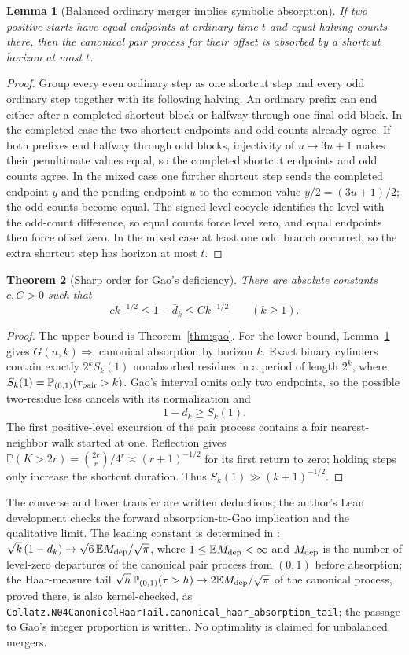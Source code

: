 \documentclass[11pt]{amsart}
\newtheorem{theorem}{Theorem}[section]
\newtheorem{lemma}[theorem]{Lemma}
\theoremstyle{definition}
\theoremstyle{remark}
\newcommand{\E}{\mathbb E}
\newcommand{\PP}{\mathbb P}
\begin{document}
\begin{lemma}[Balanced ordinary merger implies symbolic absorption]\label{lem:later-converse}
If two positive starts have equal endpoints at ordinary time $t$ and equal halving counts there, then the canonical pair process for their offset is absorbed by a shortcut horizon at most $t$.
\end{lemma}
\begin{proof}
Group every even ordinary step as one shortcut step and every odd ordinary step together with its following halving. An ordinary prefix can end either after a completed shortcut block or halfway through one final odd block. In the completed case the two shortcut endpoints and odd counts already agree. If both prefixes end halfway through odd blocks, injectivity of $u\mapsto3u+1$ makes their penultimate values equal, so the completed shortcut endpoints and odd counts agree. In the mixed case one further shortcut step sends the completed endpoint $y$ and the pending endpoint $u$ to the common value $y/2=(3u+1)/2$; the odd counts become equal. The signed-level cocycle identifies the level with the odd-count difference, so equal counts force level zero, and equal endpoints then force offset zero. In the mixed case at least one odd branch occurred, so the extra shortcut step has horizon at most $t$.
\end{proof}

\begin{theorem}[Sharp order for Gao's deficiency]\label{thm:sharp-gao}
There are absolute constants $c,C>0$ such that
\[
 c k^{-1/2}\le 1-\bar d_k\le Ck^{-1/2}\qquad(k\ge1).
\]
\end{theorem}
\begin{proof}
The upper bound is Theorem~\ref{thm:gao}. For the lower bound, Lemma~\ref{lem:later-converse} gives $G(n,k)\Rightarrow$ canonical absorption by horizon $k$. Exact binary cylinders contain exactly $2^kS_k(1)$ nonabsorbed residues in a period of length $2^k$, where $S_k(1)=\PP_{(0,1)}(\tau_{\rm pair}>k)$. Gao's interval omits only two endpoints, so the possible two-residue loss cancels with its normalization and
\[
 1-\bar d_k\ge S_k(1).
\]
The first positive-level excursion of the pair process contains a fair nearest-neighbor walk started at one. Reflection gives $\PP(K>2r)=\binom{2r}{r}/4^r\asymp(r+1)^{-1/2}$ for its first return to zero; holding steps only increase the shortcut duration. Thus $S_k(1)\gg(k+1)^{-1/2}$.
\end{proof}
The converse and lower transfer are written deductions; the author's Lean development checks the forward absorption-to-Gao implication and the qualitative limit. The leading constant is determined in \cite[Theorem~A]{Rates}: $\sqrt k\,(1-\bar d_k)\to\sqrt6\,\E M_{\rm dep}/\sqrt\pi$, where $1\le\E M_{\rm dep}<\infty$ and $M_{\rm dep}$ is the number of level-zero departures of the canonical pair process from $(0,1)$ before absorption; the Haar-measure tail $\sqrt h\,\PP_{(0,1)}(\tau>h)\to2\E M_{\rm dep}/\sqrt\pi$ of the canonical process, proved there, is also kernel-checked, as \nolinkurl{Collatz.N04CanonicalHaarTail.canonical_haar_absorption_tail}; the passage to Gao's integer proportion is written. No optimality is claimed for unbalanced mergers.
\end{document}
